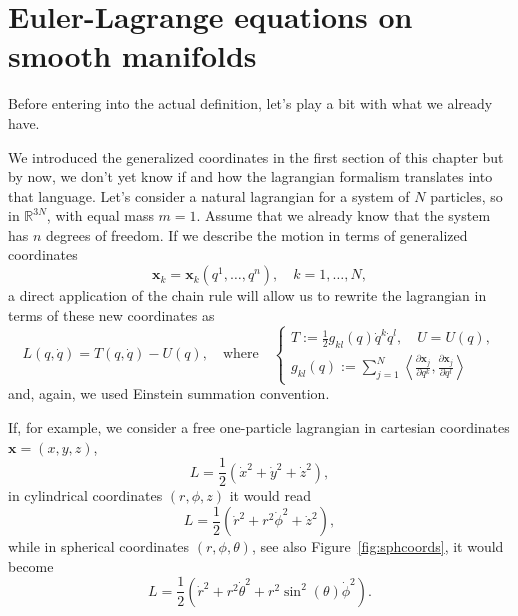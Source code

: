 \documentclass[english,fontsize=11pt,paper=a5,oneside]{scrbook}
\newcommand{\R}{\mathbb{R}}
\newcommand{\bx}{\bm{x}}
\newcommand{\lag}{\langle}
\newcommand{\rag}{\rangle}
\theoremstyle{definition}
\begin{document}
\section{Euler-Lagrange equations on smooth manifolds}\label{sec:lagrangianonmanifold}

Before entering into the actual definition, let's play a bit with what we already have.

We introduced the generalized coordinates in the first section of this chapter but by now, we don't yet know if and how the lagrangian formalism translates into that language.
Let's consider a natural lagrangian for a system of $N$ particles, so in $\R^{3N}$, with equal mass $m=1$.
Assume that we already know that the system has $n$ degrees of freedom.
If we describe the motion in terms of generalized coordinates
\begin{equation}
  \bx_k = \bx_k(q^1, \ldots, q^{n}), \quad k=1,\ldots,N,
\end{equation}
a direct application of the chain rule will allow us to rewrite the lagrangian in terms of these new coordinates as
\begin{equation}
  L(q, \dot q) = T(q, \dot q) - U(q),
  \quad\mbox{where}\quad
  \begin{cases}
    T:= \frac12 g_{kl}(q)\dot q^k \dot q^l, \quad U = U(q), \\
    g_{kl} (q) := \sum_{j=1}^N \left\lag\frac{\partial\bx_j}{\partial q^k}, \frac{\partial \bx_j}{\partial q^l}\right\rag
  \end{cases}
\end{equation}
and, again, we used Einstein summation convention.

If, for example, we consider a free one-particle lagrangian in cartesian coordinates $\bx = (x,y,z)$,
\begin{equation}
  L = \frac 12 (\dot x^2 + \dot y^2 + \dot z^2),
\end{equation}
in cylindrical coordinates $(r,\phi,z)$ it would read
\begin{equation}
  L = \frac 12 (\dot r^2 + r^2 \dot \phi^2 + \dot z^2),
\end{equation}
while in spherical coordinates $(r,\phi,\theta)$, see also Figure~\ref{fig:sphcoords}, it would become
\begin{equation}
  L = \frac 12 (\dot r^2 + r^2 \dot \theta^2 + r^2 \sin^2(\theta) \dot \phi^2).
\end{equation}
\end{document}
